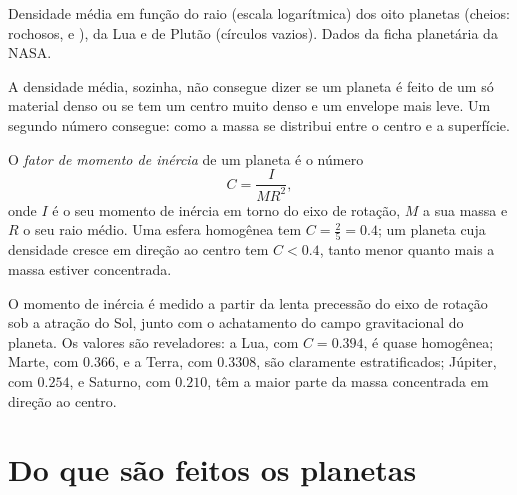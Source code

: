 \begin{omfigure}
{\small Densidade média em função do raio (escala logarítmica) dos oito planetas (cheios: rochosos,  e ), da Lua e de Plutão (círculos vazios). Dados da ficha planetária da NASA.}
\end{omfigure}

A densidade média, sozinha, não consegue dizer se um planeta é feito de um só material denso ou se tem um centro muito denso e um envelope mais leve. Um segundo número consegue: como a massa se distribui entre o centro e a superfície.

\begin{definition}\label{def:b1:comparative-planetology:moi}
O \emph{fator de momento de inércia} de um planeta é o número
\[
  C = \frac{I}{MR^2} ,
\]
onde $I$ é o seu momento de inércia em torno do eixo de rotação, $M$ a sua massa e $R$ o seu raio médio. Uma esfera homogênea tem $C = \tfrac25 = 0.4$; um planeta cuja densidade cresce em direção ao centro tem $C < 0.4$, tanto menor quanto mais a massa estiver concentrada.
\end{definition}

O momento de inércia é medido a partir da lenta precessão do eixo de rotação sob a atração do Sol, junto com o achatamento do campo gravitacional do planeta. Os valores são reveladores: a Lua, com $C = 0.394$, é quase homogênea; Marte, com $0.366$, e a Terra, com $0.3308$, são claramente estratificados; Júpiter, com $0.254$, e Saturno, com $0.210$, têm a maior parte da massa concentrada em direção ao centro.

\section{Do que são feitos os planetas}

